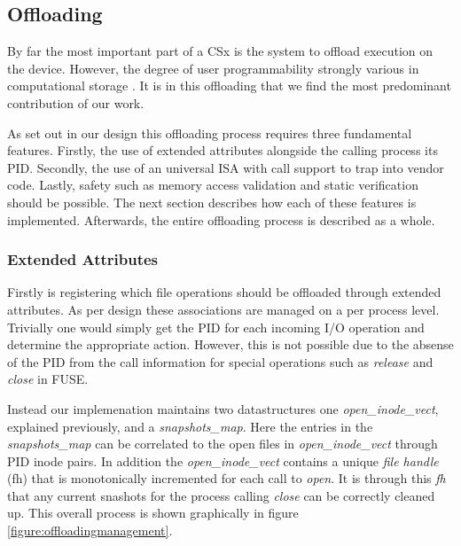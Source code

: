 \subsection{Offloading}

By far the most important part of a CSx is the system to offload execution on
the device. However, the degree of user programmability strongly various in
computational storage \cite{lukken2021past}. It is in this offloading that we
find the most predominant contribution of our work.

As set out in our design this offloading process requires three fundamental
features. Firstly, the use of extended attributes alongside the calling process
its PID. Secondly, the use of an universal ISA with call support to trap
into vendor code. Lastly, safety such as memory access validation and static
verification should be possible. The next section describes how each of these
features is implemented. Afterwards, the entire offloading process is described
as a whole.

\subsubsection{Extended Attributes}

Firstly is registering which file operations should be offloaded through
extended attributes. As per design these associations are managed on a per
process level. Trivially one would simply get the PID for each incoming I/O
operation and determine the appropriate action. However, this is not
possible due to the absense of the PID from the call information for special
operations such as \textit{release} and \textit{close} in FUSE. 

Instead our implemenation maintains two datastructures one 
\textit{open\_inode\_vect}, explained previously, and a \textit{snapshots\_map}.
Here the entries in the \textit{snapshots\_map} can be correlated to the open
files in \textit{open\_inode\_vect} through PID inode pairs. In addition the
\textit{open\_inode\_vect} contains a unique \textit{file handle} (fh) that is
monotonically incremented for each call to \textit{open}. It is through this
\textit{fh} that any current snashots for the process calling \textit{close}
can be correctly cleaned up. This overall process is shown graphically in
figure \ref{figure:offloadingmanagement}.

